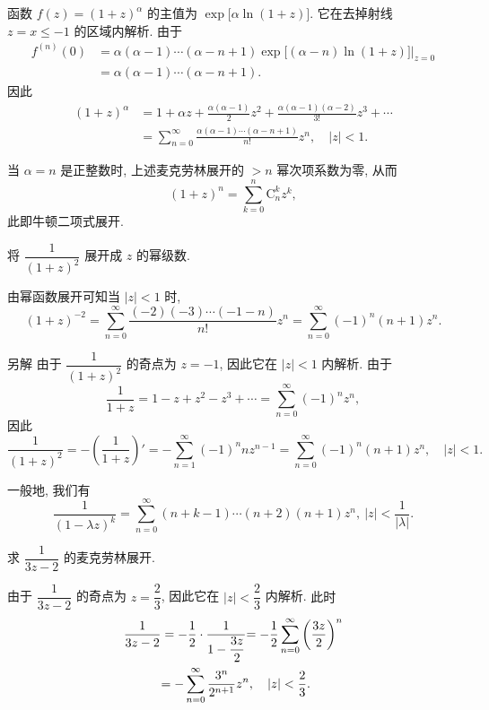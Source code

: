 \begin{example}
	函数 $f(z)=(1+z)^\alpha$ 的主值为 $\exp\bigl[\alpha\ln(1+z)\bigr]$. 它在去掉射线 $z=x\le -1$ 的区域内解析. 由于
	\begin{align*}
		f^{(n)}(0)&=\alpha(\alpha-1)\cdots(\alpha-n+1)\exp\bigl[(\alpha-n)\ln(1+z)\bigr]\Big|_{z=0}\\
		&=\alpha(\alpha-1)\cdots(\alpha-n+1).
	\end{align*}
	因此
	\begin{align*}
		(1+z)^\alpha&=1+\alpha z+\frac{\alpha(\alpha-1)}2z^2+\frac{\alpha(\alpha-1)(\alpha-2)}{3!}z^3+\cdots\\
		&=\sum_{n=0}^\infty\frac{\alpha(\alpha-1)\cdots(\alpha-n+1)}{n!}z^n,\quad |z|<1.
	\end{align*}
\end{example}

当 $\alpha=n$ 是正整数时, 上述麦克劳林展开的 $>n$ 幂次项系数为零, 
从而
	\[(1+z)^n=\sum_{k=0}^n \mathrm{C}_n^k z^k,\]
此即牛顿二项式展开.

\begin{example}
	将 $\dfrac1{(1+z)^2}$ 展开成 $z$ 的幂级数.
\end{example}

\begin{solution}
	由幂函数展开可知当 $|z|<1$ 时,
	\[(1+z)^{-2}=\sum_{n=0}^\infty \frac{(-2)(-3)\cdots(-1-n)}{n!}z^n
	{=\sum_{n=0}^\infty (-1)^n(n+1)z^n.}\]
\end{solution}

\begin{solution}{另解}
	由于 $\dfrac1{(1+z)^2}$ 的奇点为 $z=-1$, 因此它在 $|z|<1$ 内解析.
	{由于
		\[\frac1{1+z}=1-z+z^2-z^3+\cdots=\sum_{n=0}^\infty (-1)^nz^n,\]因此
		\[
		\frac1{(1+z)^2}=-\left(\frac1{1+z}\right)'
		{=-\sum_{n=1}^\infty(-1)^n nz^{n-1}}
		{=\sum_{n=0}^\infty(-1)^n (n+1)z^n,\quad |z|<1.}
		\]
	}
\end{solution}
一般地, 我们有
\[\frac1{(1-\lambda z)^k}=\sum_{n=0}^\infty(n+k-1)\cdots(n+2)(n+1)z^n,\ |z|<\frac1{|\lambda|}.\]

\begin{example}
	求 $\dfrac1{3z-2}$ 的麦克劳林展开.
\end{example}

\begin{solution}
	由于 $\dfrac1{3z-2}$ 的奇点为 $z=\dfrac23$, 因此它在 $|z|<\dfrac23$ 内解析.
	{此时
	\begin{align*}
		\frac1{3z-2}&=-\frac{1}{2}\cdot\frac1{1-\dfrac{3z}2}
			{=-\frac{1}{2}\sum_{n=0}^\infty\left(\frac{3z}2\right)^n}\\
		&{=-\sum_{n=0}^\infty\frac{3^n}{2^{n+1}}z^n,\quad|z|<\frac23.}
	\end{align*}}
\end{solution}

